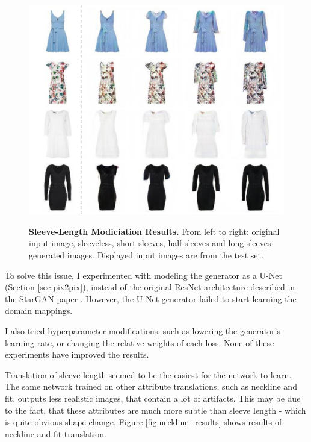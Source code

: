 \documentclass[12pt]{report}
\begin{document}
\begin{figure}[h]
\centering
{\includegraphics[width=.9\linewidth]{04_experiments/stargan/sleeve_results}}
\caption{\label{fig:sleeves_results} \textbf{Sleeve-Length Modiciation Results.} From left to right: original input image, sleeveless, short sleeves, half sleeves and long sleeves generated images. Displayed input images are from the test set.}
\end{figure}

To solve this issue, I experimented with modeling the generator as a U-Net (Section \ref{sec:pix2pix}), instead of the original ResNet architecture described in the StarGAN paper \cite{choi_stargan_2017}. However, the U-Net generator failed to start learning the domain mappings.

I also tried hyperparameter modifications, such as lowering the generator's learning rate, or changing the relative weights of each loss. None of these experiments have improved the results.

Translation of sleeve length seemed to be the easiest for the network to learn. The same network trained on other attribute translations, such as neckline and fit, outputs less realistic images, that contain a lot of artifacts. This may be due to the fact, that these attributes are much more subtle than sleeve length - which is quite obvious shape change. Figure \ref{fig:neckline_results} shows results of neckline and fit translation.
\end{document}
